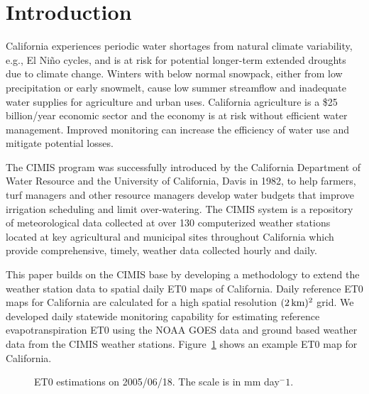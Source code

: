 \documentclass[reviewcopy]{elsart}
\begin{document}
\section{Introduction}

California experiences periodic water shortages from natural climate
variability, e.g., El Ni\~{n}o cycles, and is at risk for potential
longer-term extended droughts due to climate change. Winters with
below normal snowpack, either from low precipitation or early
snowmelt, cause low summer streamflow and inadequate water supplies
for agriculture and urban uses.  California agriculture is a \$25
billion/year economic sector and the economy is at risk without
efficient water management.  Improved monitoring can increase the
efficiency of water use and mitigate potential losses.

The \ac{CIMIS} program was successfully introduced by the California
Department of Water Resource and the University of California, Davis
in 1982, to help farmers, turf managers and other resource managers
develop water budgets that improve irrigation scheduling and limit
over-watering. The \ac{CIMIS} system is a repository of meteorological
data collected at over 130 computerized weather stations located at
key agricultural and municipal sites throughout California which
provide comprehensive, timely, weather data collected hourly and
daily.

This paper builds on the \ac{CIMIS} base by developing a methodology
to extend the weather station data to spatial daily \ac{ET0} maps of
California.  Daily reference \ac{ET0} maps for California are
calculated for a high spatial resolution $(\unit[2]{km})^2$ grid. We
developed daily statewide monitoring capability for estimating
reference evapotranspiration \ac{ET0} using the \ac{NOAA} \ac{GOES}
data and ground based weather data from the \ac{CIMIS} weather
stations.  Figure~\ref{fig:et0} shows an example \ac{ET0} map for
California.

\begin{figure}[htbp]
  \centering
  \resizebox{0.5\textwidth}{!}{}
  \caption{ \ac{ET0} estimations on 2005/06/18. The scale is in \unit{mm day$^-1$}.
}
  \label{fig:et0}
\end{figure}
    
\end{document}
